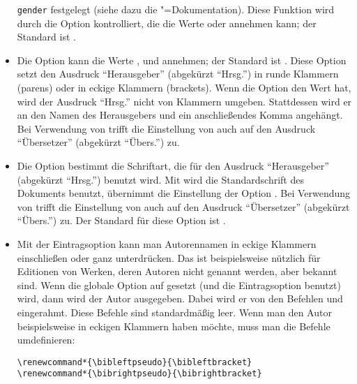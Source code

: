 \documentclass[ngerman]{scrartcl}
\begin{document}
\begin{itemize}
	      \texttt{gender} festgelegt (siehe dazu die \bl{}"=Dokumentation).
	      Diese Funktion wird durch die Option  kontrolliert,
	      die die Werte  oder  annehmen kann; 
	      der Standard ist .
	\item Die
	      Option  kann die Werte , 
	       und  annehmen; der Standard ist
	      . Diese Option setzt den Ausdruck \enquote{Herausgeber}
	      (abgekürzt \enquote{Hrsg.}) in runde Klammern (parens) oder in eckige 
	      Klammern (brackets). Wenn die Option den Wert  hat, wird 
	      der Ausdruck \enquote{Hrsg.} nicht von Klammern umgeben. Stattdessen
	      wird er an den Namen des Herausgebers und ein anschließendes Komma
	      angehängt.
	      Bei Verwendung von  trifft die Einstellung
	      von  auch auf den Ausdruck \enquote{Übersetzer}
	      (abgekürzt \enquote{Übers.}) zu.
	\item Die Option 
        bestimmt die Schriftart, die für den Ausdruck \enquote{Herausgeber}
	      (abgekürzt \enquote{Hrsg.}) benutzt wird. Mit  wird die
        Standardschrift des Dokuments benutzt,  übernimmt die
        Einstellung der Option . 
        Bei Verwendung von  trifft die Einstellung
	      von  auch auf den Ausdruck \enquote{Übersetzer}
	      (abgekürzt \enquote{Übers.}) zu. Der Standard für diese Option
        ist .
	\item Mit
	      der Eintragsoption  kann man Autorennamen
	      in eckige Klammern einschließen oder ganz unterdrücken. Das ist beispielsweise nützlich für
				Editionen von Werken, deren Autoren nicht genannt werden, aber bekannt
				sind. Wenn die globale Option  auf  gesetzt 
				(und die Eintragsoption  benutzt) wird, dann wird der 
				Autor ausgegeben. Dabei wird er von den Befehlen  und 
				eingerahmt. Diese Befehle sind standardmäßig leer. Wenn man den Autor beispielsweise in eckigen
				Klammern haben möchte, muss man die Befehle umdefinieren:
				\begin{lstlisting}
\renewcommand*{\bibleftpseudo}{\bibleftbracket}
\renewcommand*{\bibrightpseudo}{\bibrightbracket}

\end{lstlisting}
\end{itemize}
\end{document}
